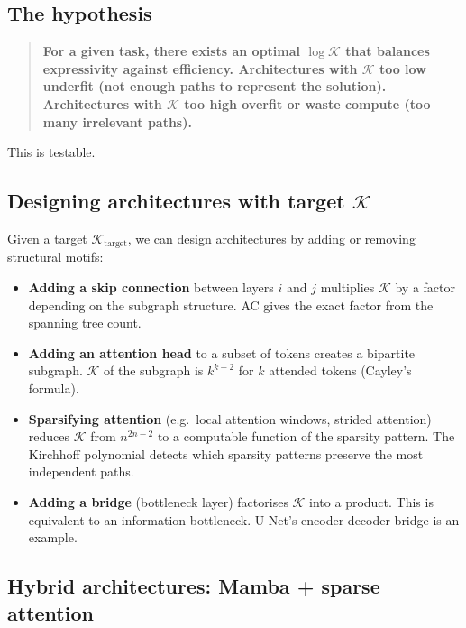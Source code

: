 \documentclass[11pt,a4paper]{article}
\newcommand{\K}{\mathcal{K}}
\begin{document}
\subsection{The hypothesis}

\begin{quote}
\textbf{For a given task, there exists an optimal $\log \K$ that
balances expressivity against efficiency.  Architectures with
$\K$ too low underfit (not enough paths to represent the solution).
Architectures with $\K$ too high overfit or waste compute
(too many irrelevant paths).}
\end{quote}

This is testable.

\subsection{Designing architectures with target $\K$}

Given a target $\K_{\text{target}}$, we can design architectures
by adding or removing structural motifs:

\begin{itemize}
\item \textbf{Adding a skip connection} between layers $i$ and $j$
  multiplies $\K$ by a factor depending on the subgraph structure.
  AC gives the exact factor from the spanning tree count.

\item \textbf{Adding an attention head} to a subset of tokens creates
  a bipartite subgraph.  $\K$ of the subgraph is $k^{k-2}$ for $k$
  attended tokens (Cayley's formula).

\item \textbf{Sparsifying attention} (e.g.\ local attention windows,
  strided attention) reduces $\K$ from $n^{2n-2}$ to a computable
  function of the sparsity pattern.  The Kirchhoff polynomial
  detects which sparsity patterns preserve the most independent paths.

\item \textbf{Adding a bridge} (bottleneck layer) factorises $\K$
  into a product.  This is equivalent to an information bottleneck.
  U-Net's encoder-decoder bridge is an example.
\end{itemize}

\subsection{Hybrid architectures: Mamba + sparse attention}
\end{document}
